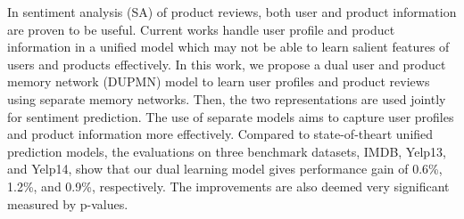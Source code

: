 In sentiment analysis (SA) of product reviews, both user and product information are proven to be useful. Current works handle user profile and product information in a unified model which may not be able to learn salient features of users and products effectively. In this work, we propose a dual user and product memory network (DUPMN) model to learn user profiles and product reviews using separate memory networks. Then, the two representations are used jointly for sentiment prediction. The use of separate models aims to capture user profiles and product information more effectively. Compared to state-of-theart unified prediction models, the evaluations on three benchmark datasets, IMDB, Yelp13, and Yelp14, show that our dual learning model gives performance gain of 0.6\%, 1.2\%, and 0.9\%, respectively. The improvements are also deemed very significant measured by p-values.
